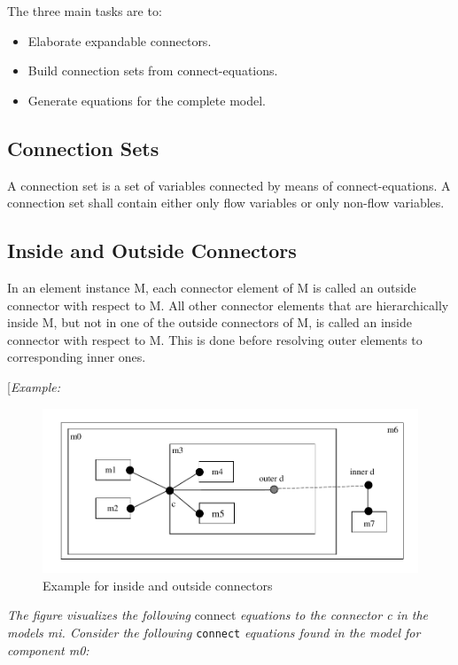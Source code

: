 \documentclass[10pt,a4paper]{report}
\def\doublelabel#1{\label{#1}}
\begin{document}
The three main tasks are to:

\begin{itemize}
\item
  Elaborate expandable connectors.
\item
  Build connection sets from connect-equations.
\item
  Generate equations for the complete model.
\end{itemize}

\subsection{Connection Sets}\doublelabel{connection-sets}

A connection set is a set of variables connected by means of
connect-equations. A connection set shall contain either only flow
variables or only non-flow variables.

\subsection{Inside and Outside Connectors}\doublelabel{inside-and-outside-connectors}

In an element instance M, each connector element of M is called an
outside connector with respect to M. All other connector elements that
are hierarchically inside M, but not in one of the outside connectors of
M, is called an inside connector with respect to M. This is done before
resolving outer elements to corresponding inner ones.

{[}\emph{Example:}
\begin{figure}[H]
\includegraphics{media/innerouterconnector}
\caption{Example for inside and outside connectors}
\end{figure}
\emph{The figure visualizes the following} connect \emph{equations to
the connector c in the models m\textit{i}. Consider the
following} \lstinline!connect! \emph{equations found in the model for component m0:}
\end{document}
